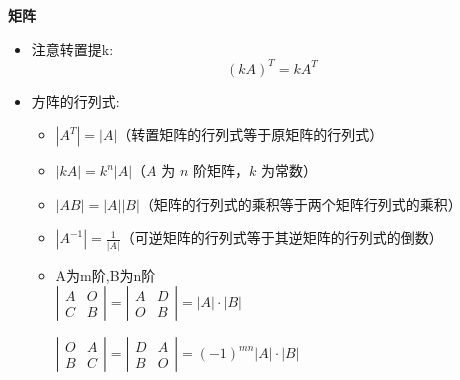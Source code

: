 \documentclass[10pt]{article}
\begin{document}
\begin{multicols}{2}
\begin{itemize}
\end{itemize}

\textbf{矩阵}
\begin{itemize}
  \item 注意转置提k:
    \[
    (kA)^T = kA^T
    \]
  \item 方阵的行列式:
    \begin{itemize}
      \item \( |A^T| = |A| \)（转置矩阵的行列式等于原矩阵的行列式）
      \item \( |kA| = k^n |A| \)（\(A\) 为 \(n\) 阶矩阵，\(k\) 为常数）
      \item \( |AB| = |A| |B| \)（矩阵的行列式的乘积等于两个矩阵行列式的乘积）
      \item \( |A^{-1}| = \frac{1}{|A|} \)（可逆矩阵的行列式等于其逆矩阵的行列式的倒数）
      \item A为m阶,B为n阶\\
      \(
        \left| \begin{matrix} A & O \\ C & B \end{matrix} \right| = \left| \begin{matrix} A & D \\ O & B \end{matrix} \right| = |A| \cdot |B|
      \)

      \(
        \left| \begin{matrix} O & A \\ B & C \end{matrix} \right| = \left| \begin{matrix} D & A \\ B & O \end{matrix} \right| = (-1)^{mn} |A| \cdot |B|
      \)
      

\end{itemize}
\end{itemize}
\end{multicols}
\end{document}
